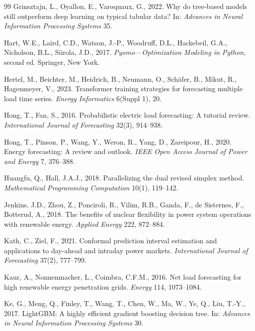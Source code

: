\documentclass[preprint,12pt,authoryear]{elsarticle}
\begin{document}
\begin{thebibliography}{99}
Grinsztajn, L., Oyallon, E., Varoquaux, G., 2022. Why do tree-based models still outperform deep learning on typical tabular data? In: \textit{Advances in Neural Information Processing Systems} 35.

Hart, W.E., Laird, C.D., Watson, J.-P., Woodruff, D.L., Hackebeil, G.A., Nicholson, B.L., Siirola, J.D., 2017. \textit{Pyomo---Optimization Modeling in Python}, second ed. Springer, New York.

Hertel, M., Beichter, M., Heidrich, B., Neumann, O., Sch\"afer, B., Mikut, R., Hagenmeyer, V., 2023. Transformer training strategies for forecasting multiple load time series. \textit{Energy Informatics} 6(Suppl 1), 20.

Hong, T., Fan, S., 2016. Probabilistic electric load forecasting: A tutorial review. \textit{International Journal of Forecasting} 32(3), 914--938.

Hong, T., Pinson, P., Wang, Y., Weron, R., Yang, D., Zareipour, H., 2020. Energy forecasting: A review and outlook. \textit{IEEE Open Access Journal of Power and Energy} 7, 376--388.

Huangfu, Q., Hall, J.A.J., 2018. Parallelizing the dual revised simplex method. \textit{Mathematical Programming Computation} 10(1), 119--142.

Jenkins, J.D., Zhou, Z., Ponciroli, R., Vilim, R.B., Ganda, F., de Sisternes, F., Botterud, A., 2018. The benefits of nuclear flexibility in power system operations with renewable energy. \textit{Applied Energy} 222, 872--884.

Kath, C., Ziel, F., 2021. Conformal prediction interval estimation and applications to day-ahead and intraday power markets. \textit{International Journal of Forecasting} 37(2), 777--799.

Kaur, A., Nonnenmacher, L., Coimbra, C.F.M., 2016. Net load forecasting for high renewable energy penetration grids. \textit{Energy} 114, 1073--1084.

Ke, G., Meng, Q., Finley, T., Wang, T., Chen, W., Ma, W., Ye, Q., Liu, T.-Y., 2017. LightGBM: A highly efficient gradient boosting decision tree. In: \textit{Advances in Neural Information Processing Systems} 30.


\end{thebibliography}
\end{document}
